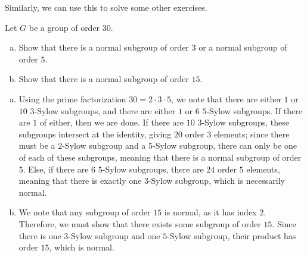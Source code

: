 \documentclass[10pt]{mypackage}
\begin{document}
Similarly, we can use this to solve some other exercises.
\begin{exercise}
  Let $G$ be a group of order $30$.
  \begin{enumerate}[(a)]
    \item Show that there is a normal subgroup of order $3$ or a normal subgroup of order $5$.
    \item Show that there is a normal subgroup of order $15$.
  \end{enumerate}
\end{exercise}
\begin{solution}\hfill
  \begin{enumerate}[(a)]
    \item Using the prime factorization $30 = 2\cdot 3 \cdot 5$, we note that there are either $1$ or $10$ $3$-Sylow subgroups, and there are either $1$ or $6$ $5$-Sylow subgroups. If there are $1$ of either, then we are done. If there are $10$ $3$-Sylow subgroups, these subgroups intersect at the identity, giving $20$ order $3$ elements; since there must be a $2$-Sylow subgroup and a $5$-Sylow subgroup, there can only be one of each of these subgroups, meaning that there is a normal subgroup of order $5$. Else, if there are $6$ $5$-Sylow subgroups, there are $24$ order $5$ elements, meaning that there is exactly one $3$-Sylow subgroup, which is necessarily normal.
    \item We note that any subgroup of order $15$ is normal, as it has index $2$. Therefore, we must show that there exists some subgroup of order $15$. Since there is one $3$-Sylow subgroup and one $5$-Sylow subgroup, their product has order $15$, which is normal.
  \end{enumerate}
\end{solution}
\end{document}
